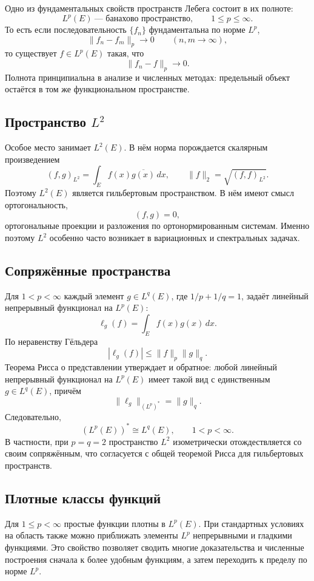Одно из фундаментальных свойств пространств Лебега состоит в их полноте:
\[
    L^p(E)\ \text{--- банахово пространство},
    \qquad 1\leq p\leq\infty.
\]
То есть если последовательность $\{f_n\}$ фундаментальна по норме $L^p$,
\[
    \|f_n-f_m\|_p\longrightarrow0
    \qquad (n,m\to\infty),
\]
то существует $f\in L^p(E)$ такая, что
\[
    \|f_n-f\|_p\to0.
\]
Полнота принципиальна в анализе и численных методах: предельный объект остаётся
в том же функциональном пространстве.

\subsection{Пространство $L^2$}

Особое место занимает $L^2(E)$. В нём норма порождается скалярным
произведением
\[
    (f,g)_{L^2}=\int_E f(x)\overline{g(x)}\,dx,
    \qquad
    \|f\|_2=\sqrt{(f,f)_{L^2}}.
\]
Поэтому $L^2(E)$ является гильбертовым пространством. В нём имеют смысл
ортогональность,
\[
    (f,g)=0,
\]
ортогональные проекции и разложения по ортонормированным системам. Именно поэтому
$L^2$ особенно часто возникает в вариационных и спектральных задачах.

\subsection{Сопряжённые пространства}

Для $1<p<\infty$ каждый элемент $g\in L^q(E)$, где
$1/p+1/q=1$, задаёт линейный непрерывный функционал на $L^p(E)$:
\[
    \ell_g(f)=\int_E f(x)g(x)\,dx.
\]
По неравенству Гёльдера
\[
    |\ell_g(f)|\leq\|f\|_p\|g\|_q.
\]
Теорема Рисса о представлении утверждает и обратное: любой линейный
непрерывный функционал на $L^p(E)$ имеет такой вид с единственным
$g\in L^q(E)$, причём
\[
    \|\ell_g\|_{(L^p)^*}=\|g\|_q.
\]
Следовательно,
\[
    (L^p(E))^*\cong L^q(E),
    \qquad 1<p<\infty.
\]
В частности, при $p=q=2$ пространство $L^2$ изометрически отождествляется со
своим сопряжённым, что согласуется с общей теоремой Рисса для гильбертовых
пространств.

\subsection{Плотные классы функций}

Для $1\leq p<\infty$ простые функции плотны в $L^p(E)$. При стандартных
условиях на область также можно приближать элементы $L^p$ непрерывными и
гладкими функциями. Это свойство позволяет сводить многие доказательства и
численные построения сначала к более удобным функциям, а затем переходить к
пределу по норме $L^p$.

